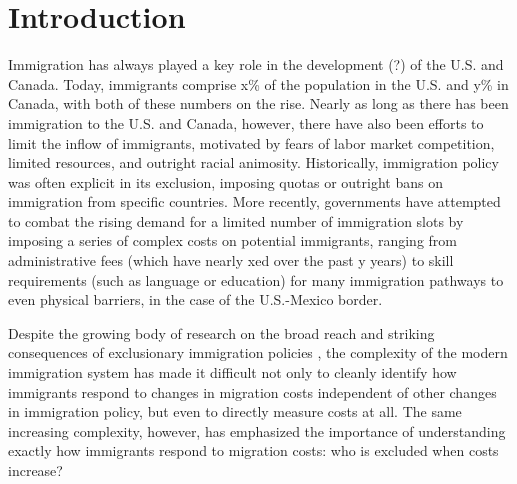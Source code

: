 \section{Introduction}
Immigration has always played a key role in the development (?) of the U.S. and Canada. Today, immigrants comprise x\% of the population in the U.S. and y\% in Canada, with both of these numbers on the rise. Nearly as long as there has been immigration to the U.S. and Canada, however, there have also been efforts to limit the inflow of immigrants, motivated by fears of labor market competition, limited resources, and outright racial animosity. Historically, immigration policy was often explicit in its exclusion, imposing quotas or outright bans on immigration from specific countries. More recently, governments have attempted to combat the rising demand for a limited number of immigration slots by imposing a series of complex costs on potential immigrants, ranging from administrative fees (which have nearly xed over the past y years) to skill requirements (such as language or education) for many immigration pathways to even physical barriers, in the case of the U.S.-Mexico border.

Despite the growing body of research on the broad reach and striking consequences of exclusionary immigration policies \citep{clemensetal2018,ChenXie2020,feigenberg2020,Abramitzkyetal2023}, the complexity of the modern immigration system has made it difficult not only to cleanly identify how immigrants respond to changes in migration costs independent of other changes in immigration policy, but even to directly measure costs at all. The same increasing complexity, however, has emphasized the importance of understanding exactly how immigrants respond to migration costs: who is excluded when costs increase?



